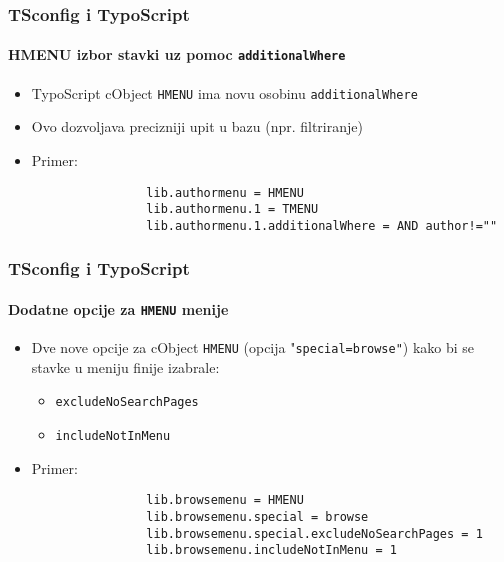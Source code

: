 \begin{frame}[fragile]
	\frametitle{TSconfig i TypoScript}
	\framesubtitle{HMENU izbor stavki uz pomoc \texttt{additionalWhere}}

	\begin{itemize}

		\item TypoScript cObject \texttt{HMENU} ima novu osobinu \texttt{additionalWhere}
		\item Ovo dozvoljava precizniji upit u bazu (npr. filtriranje)

		\item Primer:

			\begin{lstlisting}
				lib.authormenu = HMENU
				lib.authormenu.1 = TMENU
				lib.authormenu.1.additionalWhere = AND author!=""
			\end{lstlisting}

	\end{itemize}

\end{frame}


\begin{frame}[fragile]
	\frametitle{TSconfig i TypoScript}
	\framesubtitle{Dodatne opcije za \texttt{HMENU} menije}

	\begin{itemize}
		\item Dve nove opcije za cObject \texttt{HMENU} (opcija "\texttt{special=browse"})\newline
			kako bi se stavke u meniju finije izabrale:
		
			\begin{itemize}
				\item \texttt{excludeNoSearchPages}
				\item \texttt{includeNotInMenu}
			\end{itemize}

		\item Primer:

			\begin{lstlisting}
				lib.browsemenu = HMENU
				lib.browsemenu.special = browse
				lib.browsemenu.special.excludeNoSearchPages = 1
				lib.browsemenu.includeNotInMenu = 1
			\end{lstlisting}

	\end{itemize}

\end{frame}

